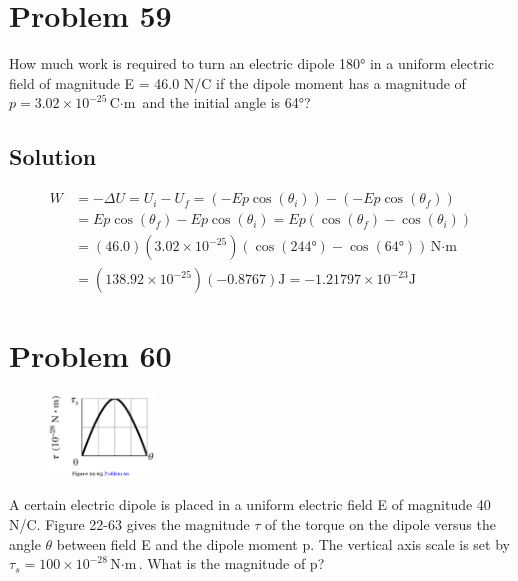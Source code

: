 \documentclass[12pt]{article}
\begin{document}
\pagebreak
\section{Problem 59}
How much work is required to turn an electric dipole 180\unit{\degree} in a uniform electric field of magnitude E = 46.0 N/C if the dipole moment has a magnitude of $p = 3.02 \times 10^{-25} \unit{\coulomb\cdot\meter}$ and the initial angle is 64\unit{\degree}?

\subsection*{Solution}
\begin{align*}
    W   &=  -\Delta U
        =   U_i - U_f
        =   (-Ep\cos(\theta_i)) - (-Ep\cos(\theta_f))\\
        &=  Ep\cos(\theta_f) - Ep\cos(\theta_i)
        =   Ep(\cos(\theta_f) - \cos(\theta_i))\\
        &=  (46.0)(3.02 \times 10^{-25})(\cos(244 \unit{\degree}) - \cos(64 \unit{\degree})) \unit{\newton\cdot\meter}\\
        &=  (138.92 \times 10^{-25})(-0.8767) \unit{\joule}
        =   \boxed{-1.21797 \times 10^{-23} \unit{\joule}}
\end{align*}

\pagebreak
\section{Problem 60}
\begin{figure}
    \vspace{-30pt}
    \includegraphics[width=0.25\textwidth]{picture_5.png} 
\end{figure}
A certain electric dipole is placed in a uniform electric field E of magnitude 40 N/C. Figure 22-63 gives the magnitude $\tau$ of the torque on the dipole versus the angle $\theta$ between field E and the dipole moment p. The vertical axis scale is set by $\tau_s = 100 \times 10^{-28} \unit{\newton\cdot\meter}$. What is the magnitude of p?
\end{document}
